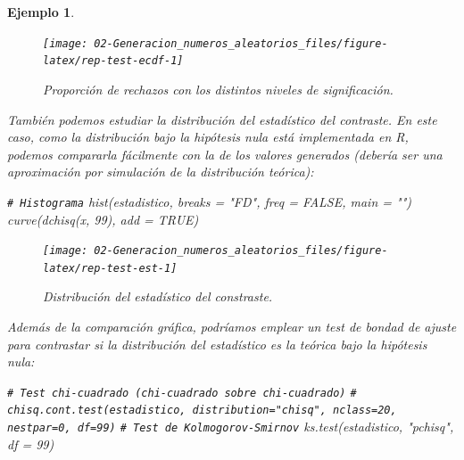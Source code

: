 \documentclass[
]{book}
\newenvironment{Shaded}{\begin{snugshade}}{\end{snugshade}}
\newcommand{\AttributeTok}[1]{\textcolor[rgb]{0.77,0.63,0.00}{#1}}
\newcommand{\CommentTok}[1]{\textcolor[rgb]{0.56,0.35,0.01}{\textit{#1}}}
\newcommand{\ConstantTok}[1]{\textcolor[rgb]{0.00,0.00,0.00}{#1}}
\newcommand{\DecValTok}[1]{\textcolor[rgb]{0.00,0.00,0.81}{#1}}
\newcommand{\FunctionTok}[1]{\textcolor[rgb]{0.00,0.00,0.00}{#1}}
\newcommand{\NormalTok}[1]{#1}
\newcommand{\StringTok}[1]{\textcolor[rgb]{0.31,0.60,0.02}{#1}}
\theoremstyle{break}
\newtheorem{example}{Ejemplo}[chapter]
\theoremstyle{nonumberplain}
\renewcommand{\CommentTok}[1]{\textcolor[rgb]{0.41,0.41,0.41}{\texttt{#1}}}
\begin{document}
\begin{example}
\begin{figure}[!htb]

{\centering \texttt{[image: 02-Generacion\_numeros\_aleatorios\_files/figure-latex/rep-test-ecdf-1]} 

}

\caption{Proporción de rechazos con los distintos niveles de significación.}\label{fig:rep-test-ecdf}
\end{figure}

También podemos estudiar la distribución del estadístico del contraste.
En este caso, como la distribución bajo la hipótesis nula está implementada en R, podemos compararla fácilmente con la de los valores generados (debería ser una aproximación por simulación de la distribución teórica):

\begin{Shaded}
\begin{Highlighting}[]
\CommentTok{\# Histograma}
\FunctionTok{hist}\NormalTok{(estadistico, }\AttributeTok{breaks =} \StringTok{"FD"}\NormalTok{, }\AttributeTok{freq =} \ConstantTok{FALSE}\NormalTok{, }\AttributeTok{main =} \StringTok{""}\NormalTok{)}
\FunctionTok{curve}\NormalTok{(}\FunctionTok{dchisq}\NormalTok{(x, }\DecValTok{99}\NormalTok{), }\AttributeTok{add =} \ConstantTok{TRUE}\NormalTok{)}
\end{Highlighting}
\end{Shaded}

\begin{figure}[!htb]

{\centering \texttt{[image: 02-Generacion\_numeros\_aleatorios\_files/figure-latex/rep-test-est-1]} 

}

\caption{Distribución del estadístico del constraste.}\label{fig:rep-test-est}
\end{figure}

Además de la comparación gráfica, podríamos emplear un test de bondad de ajuste para contrastar si la distribución del estadístico es la teórica bajo la hipótesis nula:

\begin{Shaded}
\begin{Highlighting}[]
\CommentTok{\# Test chi{-}cuadrado (chi{-}cuadrado sobre chi{-}cuadrado)}
\CommentTok{\# chisq.cont.test(estadistico, distribution="chisq", nclass=20, nestpar=0, df=99)}
\CommentTok{\# Test de Kolmogorov{-}Smirnov}
\FunctionTok{ks.test}\NormalTok{(estadistico, }\StringTok{"pchisq"}\NormalTok{, }\AttributeTok{df =} \DecValTok{99}\NormalTok{)}
\end{Highlighting}
\end{Shaded}


\end{example}
\end{document}
